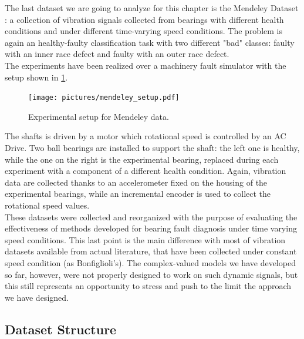 \documentclass[../main.tex]{subfiles}
\begin{document}
The last dataset we are going to analyze for this chapter is the Mendeley Dataset \cite{mendeley_dataset}: a collection of vibration signals collected from bearings with different health conditions and under different time-varying speed conditions. The problem is again an healthy-faulty classification task with two different "bad" classes: faulty with an inner race defect and faulty with an outer race defect. \\
The experiments have been realized over a machinery fault simulator with the setup shown in \ref{fig:mendeley_setup}. 
\begin{figure}[ht]
	\centering
	\texttt{[image: pictures/mendeley\_setup.pdf]}
	\caption{Experimental setup for Mendeley data.}
	\label{fig:mendeley_setup}
\end{figure}
The shafts is driven by a motor which rotational speed is controlled by an AC Drive. Two ball bearings are installed to support the shaft: the left one is healthy, while the one on the right is the experimental bearing, replaced during each experiment with a component of a different health condition. Again, vibration data are collected thanks to an accelerometer fixed on the housing of the experimental bearings,  while an incremental encoder is used to collect the rotational speed values.\\
These datasets were collected and reorganized with the purpose of evaluating the effectiveness of methods developed for bearing fault diagnosis under time varying speed conditions. This last point is the main difference with most of vibration datasets available from actual literature, that have been collected under constant speed condition (as Bonfiglioli's). The complex-valued models we have developed so far, however, were not properly designed to work on such dynamic signals, but this still represents an opportunity to stress and push to the limit the approach we have designed.

\subsection{Dataset Structure}
\end{document}
